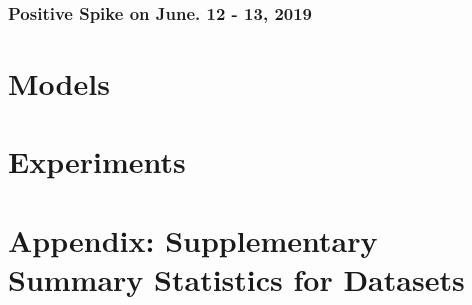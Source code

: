 \documentclass[12pt]{article}
\begin{document}
	\subsubsection{Positive Spike on June. 12 - 13, 2019}
	\section{Models}
	
	\section{Experiments}

	
	
	

	\section{Appendix: Supplementary Summary Statistics for Datasets}
\end{document}
